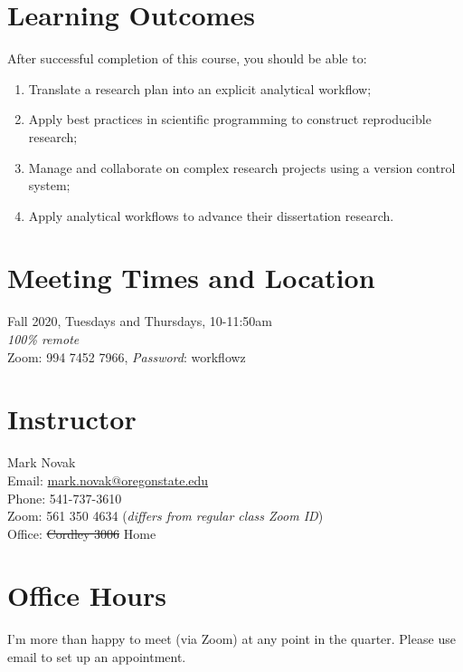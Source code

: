 \documentclass[10pt]{article}
\begin{document}
\section*{Learning Outcomes}
\noindent
After successful completion of this course, you should be able to:
\begin{enumerate}
	\itemsep0em 
	\item Translate a research plan into an explicit analytical workflow;
	\item Apply best practices in scientific programming to construct reproducible research;
	\item Manage and collaborate on complex research projects using a version control system;
	\item Apply analytical workflows to advance their dissertation research.
\end{enumerate}
	
\section*{Meeting Times and Location}
\noindent
	Fall 2020, Tuesdays and Thursdays, 10-11:50am\\
	\emph{100\% remote}\\
	Zoom:  994 7452 7966, \emph{Password}: workflowz

\section*{Instructor}
\noindent
	Mark Novak\\
	Email: \href{mailto:mark.novak@oregonstate.edu}{mark.novak@oregonstate.edu}\\
	Phone: 541-737-3610\\
	Zoom:  561 350 4634 (\emph{differs from regular class Zoom ID})\\
	Office: \st{Cordley 3006} Home

\section*{Office Hours}
\noindent
	I'm more than happy to meet (via Zoom) at any point in the quarter.
	Please use email to set up an appointment. 
\end{document}
